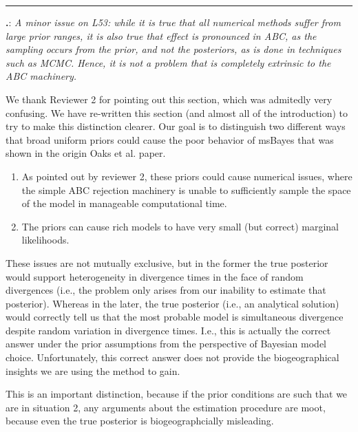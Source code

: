 \documentclass[12pt]{article}
\newcounter{commentCounter}
\newcommand{\revcomment}[1]{{\addtocounter{commentCounter}{1}}
    \medskip \hrule \noindent
\textbf{\arabic{section}.\arabic{commentCounter}}: {\sl #1}\par\xspace}
\newcommand{\response}[1]{{\addtolength{\leftskip}{0.25in} #1\par}\xspace}
\begin{document}
\revcomment{
    A minor issue on L53: while it is true that all numerical methods suffer
    from large prior ranges, it is also true that effect is pronounced in ABC,
    as the sampling occurs from the prior, and not the posteriors, as is done
    in techniques such as MCMC. Hence, it is not a problem that is completely
    extrinsic to the ABC machinery.
}
\response{
    We thank Reviewer 2 for pointing out this section, which was admitedly very
    confusing. We have re-written this section (and almost all of the
    introduction) to try to make this distinction clearer. Our goal is to
    distinguish two different ways that broad uniform priors could cause the
    poor behavior of msBayes that was shown in the origin Oaks et al. paper.
    \begin{enumerate}
        \item As pointed out by reviewer 2, these priors could cause numerical
            issues, where the simple ABC rejection machinery is unable to
            sufficiently sample the space of the model in manageable
            computational time.
        \item The priors can cause rich models to have very small (but correct)
            marginal likelihoods.
    \end{enumerate}

    These issues are not mutually exclusive, but in the former the true
    posterior would support heterogeneity in divergence times in the face of
    random divergences (i.e., the problem only arises from our inability to
    estimate that posterior).
    Whereas in the later, the true posterior (i.e., an analytical solution)
    would correctly tell us that the most probable model is simultaneous
    divergence despite random variation in divergence times. I.e., this is
    actually the correct answer under the prior assumptions from the
    perspective of Bayesian model choice. Unfortunately, this correct answer
    does not provide the biogeographical insights we are using the method to
    gain.

    This is an important distinction, because if the prior conditions are such
    that we are in situation 2, any arguments about the estimation procedure
    are moot, because even the true posterior is biogeographcially misleading.
}



\end{document}
